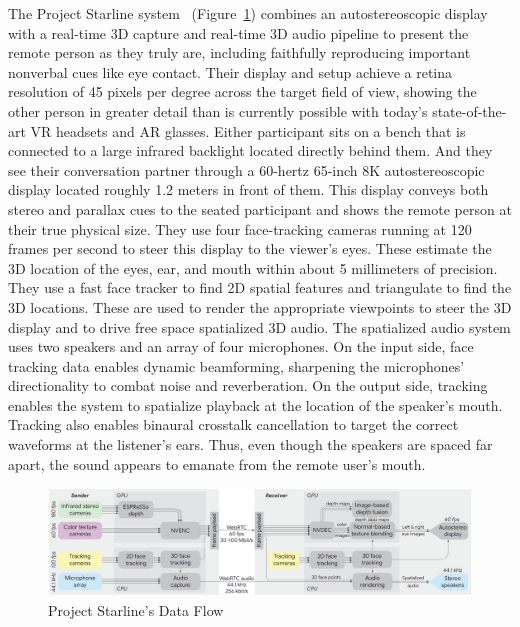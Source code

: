 The Project Starline system~\cite{google_ar__vr_project_2021} (Figure~\ref{fig:starline-data-flow}) combines an autostereoscopic display with a real-time 3D capture and real-time 3D audio pipeline to present the remote person as they truly are, including faithfully reproducing important nonverbal cues like eye contact. Their display and setup achieve a retina resolution of 45 pixels per degree across the target field of view, showing the other person in greater detail than is currently possible with today's state-of-the-art VR headsets and AR glasses. Either participant sits on a bench that is connected to a large infrared backlight located directly behind them. And they see their conversation partner through a 60-hertz 65-inch 8K autostereoscopic display located roughly 1.2 meters in front of them. This display conveys both stereo and parallax cues to the seated participant and shows the remote person at their true physical size. They use four face-tracking cameras running at 120 frames per second to steer this display to the viewer's eyes. These estimate the 3D location of the eyes, ear, and mouth within about 5 millimeters of precision. They use a fast face tracker to find 2D spatial features and triangulate to find the 3D locations. These are used to render the appropriate viewpoints to steer the 3D display and to drive free space spatialized 3D audio. The spatialized audio system uses two speakers and an array of four microphones. On the input side, face tracking data enables dynamic beamforming, sharpening the microphones' directionality to combat noise and reverberation. On the output side, tracking enables the system to spatialize playback at the location of the speaker's mouth. Tracking also enables binaural crosstalk cancellation to target the correct waveforms at the listener's ears. Thus, even though the speakers are spaced far apart, the sound appears to emanate from the remote user's mouth.

\begin{figure}[!h]
    \includegraphics[width=1\columnwidth]{figures/project-starline-data-flow.png}
    \caption{Project Starline's Data Flow~\cite{lawrence_project_2021}}
    \label{fig:starline-data-flow}
\end{figure}

